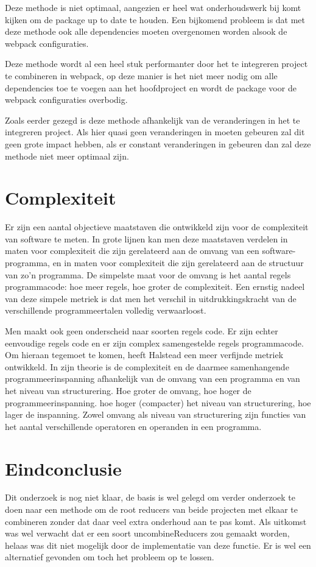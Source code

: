 Deze methode is niet optimaal, aangezien er heel wat onderhoudswerk bij komt kijken om de package up to date te houden. Een bijkomend probleem is dat met deze methode ook alle dependencies moeten overgenomen worden alsook de webpack configuraties. 

Deze methode wordt al een heel stuk performanter door het te integreren project te combineren in webpack, op deze manier is het niet meer nodig om alle dependencies toe te voegen aan het hoofdproject en wordt de package voor de webpack configuraties overbodig. 

Zoals eerder gezegd is deze methode afhankelijk van de veranderingen in het te integreren project. Als hier quasi geen veranderingen in moeten gebeuren zal dit geen grote impact hebben, als er constant veranderingen in gebeuren dan zal deze methode niet meer optimaal zijn. 

\section{Complexiteit}
Er zijn een aantal objectieve maatstaven die ontwikkeld zijn voor de complexiteit van software te meten. In grote lijnen kan men deze maatstaven verdelen in maten voor complexiteit die zijn gerelateerd aan de omvang van een software-programma, en in maten voor complexiteit die zijn gerelateerd aan de structuur van zo'n programma. De simpelste maat voor de omvang is het aantal regels programmacode: hoe meer regels, hoe groter de complexiteit. Een ernstig nadeel van deze simpele metriek is dat men het verschil in uitdrukkingskracht van de verschillende programmeertalen volledig verwaarloost.

Men maakt ook geen onderscheid naar soorten regels code. Er zijn echter eenvoudige regels code en er zijn complex samengestelde regels programmacode. Om hieraan tegemoet te komen, heeft Halstead een meer verfijnde metriek ontwikkeld. In zijn theorie is de complexiteit en de daarmee samenhangende programmeerinspanning afhankelijk van de omvang van een programma en van het niveau van structurering. Hoe groter de omvang, hoe hoger de programmeerinspanning. hoe hoger (compacter) het niveau van structurering, hoe lager de inspanning. Zowel omvang als niveau van structurering zijn functies van het aantal verschillende operatoren en operanden in een programma.
\autocite{complexiteit01}



\section{Eindconclusie}
Dit onderzoek is nog niet klaar, de basis is wel gelegd om verder onderzoek te doen naar een methode om de root reducers van beide projecten met elkaar te combineren zonder dat daar veel extra onderhoud aan te pas komt. Als uitkomst was wel verwacht dat er een soort uncombineReducers zou gemaakt worden, helaas was dit niet mogelijk door de implementatie van deze functie. Er is wel een alternatief gevonden om toch het probleem op te lossen. 

